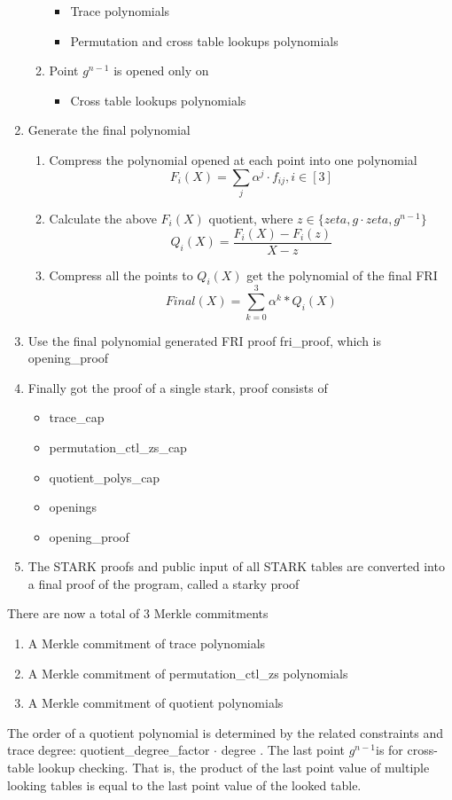 \begin{enumerate}
\begin{enumerate}
            \begin{itemize}
                \item Trace polynomials
                \item Permutation and cross table lookups polynomials
            \end{itemize}
        \item Point $ g^{n-1} $ is opened only on
            \begin{itemize}
                \item Cross table lookups polynomials
            \end{itemize}
        \end{enumerate}
    \item Generate the final polynomial
        \begin{enumerate}
            \item Compress the polynomial opened at each point into one polynomial $$ F_i(X) = \sum_{j} \alpha^j \cdot f_{ij}, i \in [3] $$
            \item Calculate the above $ F_i(X) $ quotient, where $ z \in \{ zeta, g \cdot zeta, g^{n-1} \} $ $$ Q_i(X) = \frac{F_i(X) - F_i(z)}{X - z} $$
            \item Compress all the points to $ Q_i(X) $ get the polynomial of the final FRI $$ Final(X) = \sum_{k=0}^3 \alpha^k * Q_i(X) $$
        \end{enumerate}
    \item Use the final polynomial generated FRI proof fri\_proof, which is opening\_proof
    \item Finally got the proof of a single stark, proof consists of
        \begin{itemize}
            \item trace\_cap
            \item permutation\_ctl\_zs\_cap
            \item quotient\_polys\_cap
            \item openings
            \item opening\_proof
        \end{itemize}
    \item The STARK proofs and public input of all STARK tables are converted into a final proof of the program, called a starky proof
\end{enumerate}

\noindent There are now a total of 3 Merkle commitments

\begin{enumerate}
    \item A Merkle commitment of trace polynomials
    \item A Merkle commitment of permutation\_ctl\_zs polynomials
    \item A Merkle commitment of quotient polynomials
\end{enumerate}

The order of a quotient polynomial is determined by the related constraints and trace degree: quotient\_degree\_factor $ \cdot $ degree . The last point $ g^{n-1} $is for cross-table lookup checking. That is, the product of the last point value of multiple looking tables is equal to the last point value of the looked table.
